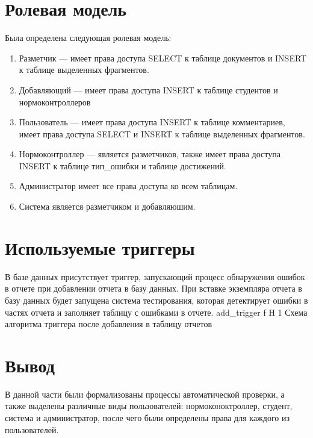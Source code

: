 \section{Ролевая модель}
Была определена следующая ролевая модель:
\begin{enumerate}
	\item Разметчик --- имеет права доступа SELECT к таблице документов и INSERT к таблице выделенных фрагментов.
	\item Добавляющий --- имеет права доступа INSERT к таблице студентов и нормоконтроллеров
	\item Пользователь --- имеет права доступа INSERT к таблице комментариев, имеет права доступа SELECT  и INSERT к таблице выделенных фрагментов.
	\item Нормоконтроллер --- является разметчиков, также имеет права доступа INSERT к таблице тип\_ошибки и таблице достижений.
	\item Администратор имеет все права доступа ко всем таблицам.
	\item Система является разметчиком и добавляюшим.
\end{enumerate}
\section{Используемые триггеры}
В базе данных присутствует триггер, запускающий процесс обнаружения ошибок в отчете при добавлении отчета в базу данных. При вставке экземпляра отчета в базу данных будет запущена система тестирования, которая детектирует ошибки в частях отчета и заполняет таблицу с ошибками в отчете. 
{add_trigger} %
{f} %
{H} %
{1\textwidth} %
{Схема алгоритма триггера после добавления в таблицу отчетов} %

\section*{Вывод}
В данной части были формализованы процессы автоматической проверки, а также выделены различные виды пользователей: нормоконоктроллер, студент, система и администратор, после чего были определены права для каждого из пользователей.




